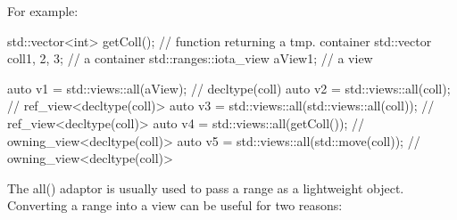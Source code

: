 For example:

\begin{cpp}
std::vector<int> getColl(); // function returning a tmp. container
std::vector coll{1, 2, 3}; // a container
std::ranges::iota_view aView{1}; // a view

auto v1 = std::views::all(aView); // decltype(coll)
auto v2 = std::views::all(coll); // ref_view<decltype(coll)>
auto v3 = std::views::all(std::views::all(coll)); // ref_view<decltype(coll)>
auto v4 = std::views::all(getColl()); // owning_view<decltype(coll)>
auto v5 = std::views::all(std::move(coll)); // owning_view<decltype(coll)>
\end{cpp}

The all() adaptor is usually used to pass a range as a lightweight object. Converting a range into a view can be useful for two reasons:

